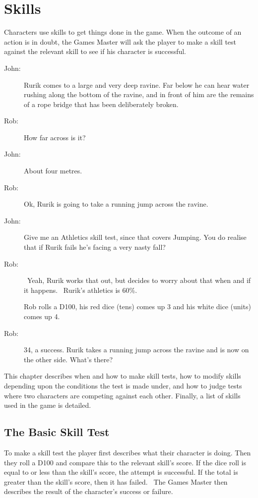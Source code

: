 \chapter{Skills}
\label{ch:skills}

Characters use skills to get things done in the game. When the outcome of an action is in doubt, the Games Master will ask the player to make a skill test against the relevant skill to see if his character is successful.

\begin{rpg-examplebox}
\begin{description}
	\item[John:] Rurik comes to a large and very deep ravine. Far below he can hear water rushing along the bottom of the ravine, and in front of him are the remains of a rope bridge that has been deliberately broken.
	\item[Rob:] How far across is it?
	\item[John:] About four metres.
	\item[Rob:] Ok, Rurik is going to take a running jump across the ravine.
	\item[John:] Give me an Athletics skill test, since that covers Jumping. You do realise that if Rurik fails he’s facing a very nasty fall?
	\item[Rob:] Yeah, Rurik works that out, but decides to worry about that when and if it happens.  Rurik’s athletics is 60\%.
	\item[] Rob rolls a D100, his red dice (tens) comes up 3 and his white dice (units) comes up 4.
	\item[Rob:] 34, a success. Rurik takes a running jump across the ravine and is now on the other side. What’s there?
\end{description}
\end{rpg-examplebox}

This chapter describes when and how to make skill tests, how to modify skills depending upon the conditions the test is made under, and how to judge tests where two characters are competing against each other. Finally, a list of skills used in the game is detailed.

\section{The Basic Skill Test}
To make a skill test the player first describes what their character is doing. Then they roll a D100 and compare this to the relevant skill’s score. If the dice roll is equal to or less than the skill’s score, the attempt is successful. If the total is greater than the skill’s score, then it has failed.  The Games Master then describes the result of the character’s success or failure.

